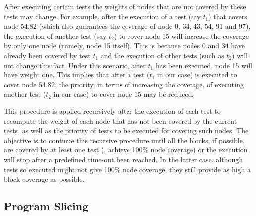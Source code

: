 After executing certain tests the weights of nodes that are not
covered by these tests may change. For example, after the
execution of a test (say $t_1$) that covers node 54.82 (which also
guarantees the coverage of node 0, 34, 43, 54, 91 and 97), the
execution of another test (say $t_2$) to cover node 15 will
increase the coverage by only one node (namely, node 15 itself).
This is because nodes 0 and 34 have already been covered by test
$t_1$ and the execution of other tests (such as $t_2$) will not
change this fact. Under this scenario, after $t_1$ has been
executed, node 15 will have weight one. This implies that after a
test ($t_1$ in our case) is executed to cover node 54.82, the
priority, in terms of increasing the coverage, of executing
another test ($t_2$ in our case) to cover node 15 may be reduced.

This procedure is applied recursively after the execution of each
test to recompute the weight of each node that has not been
covered by the current tests, as well as the priority of tests to
be executed for covering such nodes. The objective is to continue
this recursive procedure until all the blocks, if possible, are
covered by at least one test (\ie, achieve 100\% node coverage) or
the execution will stop after a predefined time-out been reached.
In the latter case, although tests so executed might not give
100\% node coverage, they still provide as high a block coverage
as possible. 

\subsection{Program Slicing}\label{sec:slicing}

